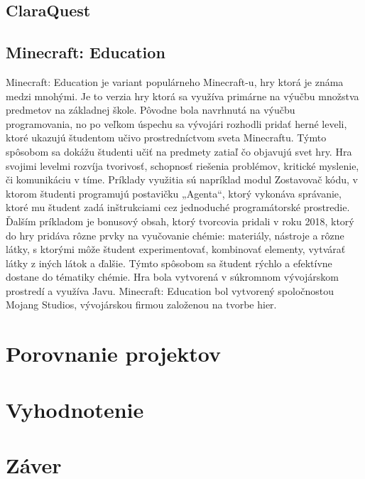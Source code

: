 \documentclass[10pt,twoside,slovak,a4paper]{article}
\begin{document}
\subsection{ClaraQuest}

\subsection{Minecraft: Education}
Minecraft: Education je variant populárneho Minecraft-u, hry ktorá je známa medzi mnohými. Je to verzia hry ktorá sa využíva primárne na výučbu množstva predmetov na základnej škole. Pôvodne bola navrhnutá na výučbu programovania, no po veľkom úspechu sa vývojári rozhodli pridať herné leveli, ktoré ukazujú študentom učivo prostredníctvom sveta Minecraftu. Týmto spôsobom sa dokážu študenti učiť na predmety  zatiaľ čo objavujú svet hry. Hra svojimi levelmi rozvíja tvorivosť, schopnosť riešenia problémov, kritické myslenie, či komunikáciu v tíme. Príklady využitia sú napríklad modul Zostavovač kódu, v ktorom študenti programujú postavičku „Agenta“, ktorý vykonáva správanie, ktoré mu študent zadá inštrukciami cez jednoduché programátorské prostredie. Ďalším príkladom je bonusový obsah, ktorý tvorcovia pridali v roku 2018, ktorý do hry pridáva rôzne prvky na vyučovanie chémie: materiály, nástroje a rôzne látky, s ktorými môže študent experimentovať, kombinovať elementy, vytvárať látky z iných látok a ďalšie. Týmto spôsobom sa študent rýchlo a efektívne dostane do tématiky chémie. Hra bola vytvorená v súkromnom vývojárskom prostredí a využíva Javu. Minecraft: Education bol vytvorený spoločnostou Mojang Studios, vývojárskou firmou založenou na tvorbe hier. 

\section{Porovnanie projektov}

\section{Vyhodnotenie}

\section{Záver}



 

\end{document}
